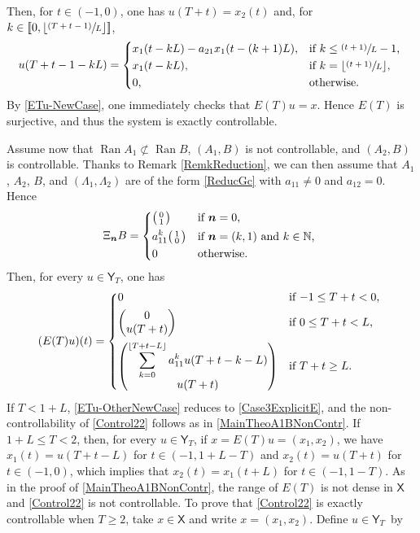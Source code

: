 \documentclass[10pt]{amsart}
\newcommand{\psfrac}[2]{\sfrac{(#1)}{#2}}
\newcommand{\bn}{\boldsymbol{n}}
\newenvironment{smallpmatrix}{\big(\begin{smallmatrix}}{\end{smallmatrix}\big)}
\newcommand{\llbracket}{[\![}
\newcommand{\rrbracket}{]\!]}
\theoremstyle{plain}
\theoremstyle{definition}
\DeclareMathOperator{\range}{Ran}
\newcommand{\floor}[1]{\left\lfloor #1 \right\rfloor}
\begin{document}
Then, for $t \in (-1, 0)$, one has $u(T + t) = x_2(t)$ and, for $k \in \left\llbracket 0, \floor{\psfrac{T + t - 1}{L}}\right\rrbracket$,
\[
u(T + t - 1 - k L) =
\begin{dcases*}
x_1(t - k L) - a_{21} x_1(t - (k+1)L), & if $k \leq \psfrac{t+1}{L} - 1$, \\
x_1(t - k L), & if $k = \floor{\psfrac{t + 1}{L}}$, \\
0, & otherwise.
\end{dcases*}
\]
By \eqref{ETu-NewCase}, one immediately checks that $E(T) u = x$. Hence $E(T)$ is surjective, and thus the system is exactly controllable.

Assume now that $\range A_1 \not\subset \range B$, $(A_1, B)$ is not controllable, and $(A_2, B)$ is controllable. Thanks to Remark \ref{RemkReduction}, we can then assume that $A_1$, $A_2$, $B$, and $(\Lambda_1, \Lambda_2)$ are of the form \eqref{ReducGc} with $a_{11} \neq 0$ and $a_{12} = 0$. Hence
\[
\Xi_{\bn} B =
\begin{dcases*}
\begin{smallpmatrix}0 \\ 1 \\\end{smallpmatrix} & if $\bn = 0$, \\
a_{11}^k \begin{smallpmatrix}1 \\ 0 \\\end{smallpmatrix} & if $\bn = (k, 1)$ and $k \in \mathbb N$, \\
0 & otherwise.
\end{dcases*}
\]
Then, for every $u \in \mathsf Y_T$, one has
\begin{equation}
\label{ETu-OtherNewCase}
(E(T) u)(t) =
\begin{dcases*}
0 & if $-1 \leq T + t < 0$, \\
\begin{pmatrix}0 \\ u(T + t)\end{pmatrix} & if $0 \leq T + t < L$, \\
\begin{pmatrix} \displaystyle\sum_{k=0}^{\floor{T + t - L}} a_{11}^k u(T + t - k - L) \\ u(T + t)\end{pmatrix} & if $T + t \geq L$.
\end{dcases*}
\end{equation}
If $T < 1 + L$, \eqref{ETu-OtherNewCase} reduces to \eqref{Case3ExplicitE}, and the non-controllability of \eqref{Control22} follows as in \eqref{MainTheoA1BNonContr}. If $1 + L \leq T < 2$, then, for every $u \in \mathsf Y_T$, if $x = E(T) u = (x_1, x_2)$, we have $x_1(t) = u(T + t - L)$ for $t \in (-1, 1 + L - T)$ and $x_2(t) = u(T + t)$ for $t \in (-1, 0)$, which implies that $x_2(t) = x_1(t + L)$ for $t \in (-1, 1 - T)$. As in the proof of \eqref{MainTheoA1BNonContr}, the range of $E(T)$ is not dense in $\mathsf X$ and \eqref{Control22} is not controllable. To prove that \eqref{Control22} is exactly controllable when $T \geq 2$, take $x \in \mathsf X$ and write $x = (x_1, x_2)$. Define $u \in \mathsf Y_T$~by
\end{document}
